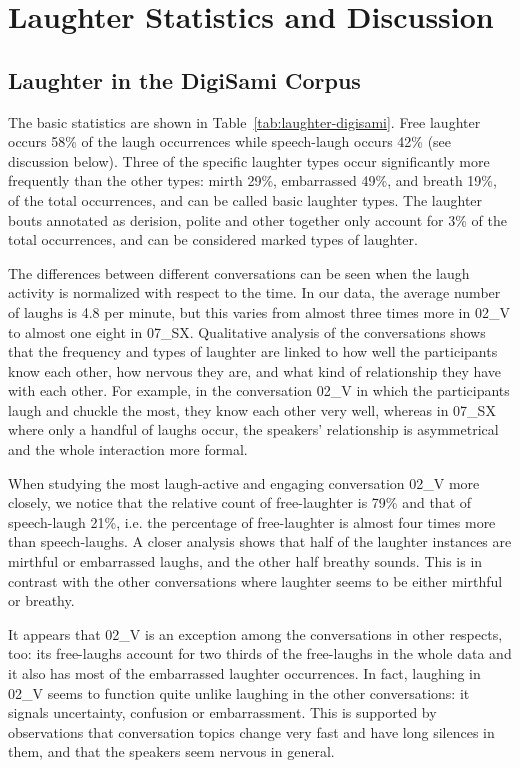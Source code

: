 \documentclass[10pt,journal,compsoc]{IEEEtran}
\begin{document}
\section{Laughter Statistics and Discussion}
\label{sec:statistics}

\subsection{Laughter in the DigiSami Corpus}

The basic statistics are shown in Table~\ref{tab:laughter-digisami}. Free laughter occurs 58\% of the laugh occurrences while speech-laugh occurs 42\% (see discussion below). Three of the specific laughter types occur significantly more frequently than the other types: mirth 29\%, embarrassed 49\%, and breath 19\%, of the total occurrences, and can be called basic laughter types. The laughter bouts annotated as derision, polite and other together only account for 3\% of the total occurrences, and can be considered marked types of laughter.

The differences between different conversations can be seen when the laugh activity is normalized with respect to the time. In our data, the average number of laughs is 4.8 per minute, but this varies from almost three times more in 02\_V to almost one eight in 07\_SX. Qualitative analysis of the conversations shows that the frequency and types of laughter are linked to how well the participants know each other, how nervous they are, and what kind of relationship they have with each other. For example, in the conversation 02\_V in which the participants laugh and chuckle the most, they know each other very well, whereas in 07\_SX where only a handful of laughs occur, the speakers' relationship is asymmetrical and the whole interaction more formal.

When studying the most laugh-active and engaging conversation 02\_V more closely, we notice that the relative count of free-laughter is 79\% and that of speech-laugh 21\%, i.e. the percentage of free-laughter is almost four times more than speech-laughs. A closer analysis shows that half of the laughter instances are mirthful or embarrassed laughs, and the other half breathy sounds. This is in contrast with the other conversations where laughter seems to be either mirthful or breathy.

It appears that 02\_V is an exception among the conversations in other respects, too: its free-laughs account for two thirds of the free-laughs in the whole data and it also has most of the embarrassed laughter occurrences. In fact, laughing in 02\_V seems to function quite unlike laughing in the other conversations: it signals uncertainty, confusion or embarrassment. This is supported by observations that conversation topics change very fast and have long silences in them, and that the speakers seem nervous in general.
\end{document}
